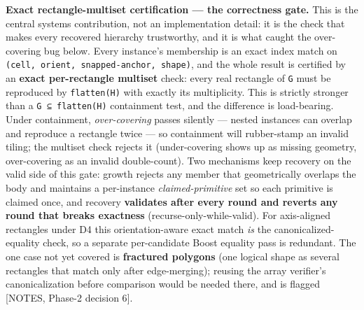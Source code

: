 \documentclass[
  11pt,
]{article}
\begin{document}
\textbf{Exact rectangle-multiset certification --- the correctness
gate.} This is the central systems contribution, not an implementation
detail: it is the check that makes every recovered hierarchy
trustworthy, and it is what caught the over-covering bug below. Every
instance's membership is an exact index match on
\texttt{(cell,\ orient,\ snapped-anchor,\ shape)}, and the whole result
is certified by an \textbf{exact per-rectangle multiset} check: every
real rectangle of \texttt{G} must be reproduced by \texttt{flatten(H)}
with exactly its multiplicity. This is strictly stronger than a
\texttt{G\ ⊆\ flatten(H)} containment test, and the difference is
load-bearing. Under containment, \emph{over-covering} passes silently
--- nested instances can overlap and reproduce a rectangle twice --- so
containment will rubber-stamp an invalid tiling; the multiset check
rejects it (under-covering shows up as missing geometry, over-covering
as an invalid double-count). Two mechanisms keep recovery on the valid
side of this gate: growth rejects any member that geometrically overlaps
the body and maintains a per-instance \emph{claimed-primitive} set so
each primitive is claimed once, and recovery \textbf{validates after
every round and reverts any round that breaks exactness}
(recurse-only-while-valid). For axis-aligned rectangles under D4 this
orientation-aware exact match \emph{is} the canonicalized-equality
check, so a separate per-candidate Boost equality pass is redundant. The
one case not yet covered is \textbf{fractured polygons} (one logical
shape as several rectangles that match only after edge-merging); reusing
the array verifier's canonicalization before comparison would be needed
there, and is flagged {[}NOTES, Phase-2 decision 6{]}.
\end{document}
